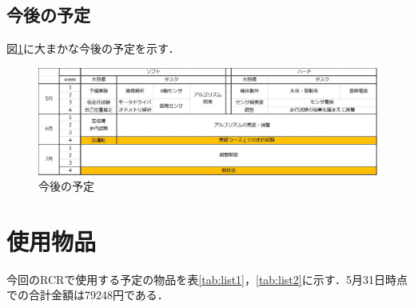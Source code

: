 \documentclass[10pt,a4j]{jarticle}
\begin{document}
\subsection{今後の予定}
図\ref{fig:schedule}に大まかな今後の予定を示す．
\begin{figure}[tH]
\begin{center}
  \includegraphics[width=1.0\hsize]{./picture/schedule.eps}
 \caption{今後の予定}
 \label{fig:schedule}
\end{center}
\end{figure}



\section{使用物品}
今回のRCRで使用する予定の物品を表\ref{tab:list1}，\ref{tab:list2}に示す．5月31日時点での合計金額は79248円である．




\newpage
\setcounter{page}{1}
\pagestyle{fancy}
\renewcommand{\headrulewidth}{0.0pt}
\lhead{}
\cfoot{}

\end{document}

